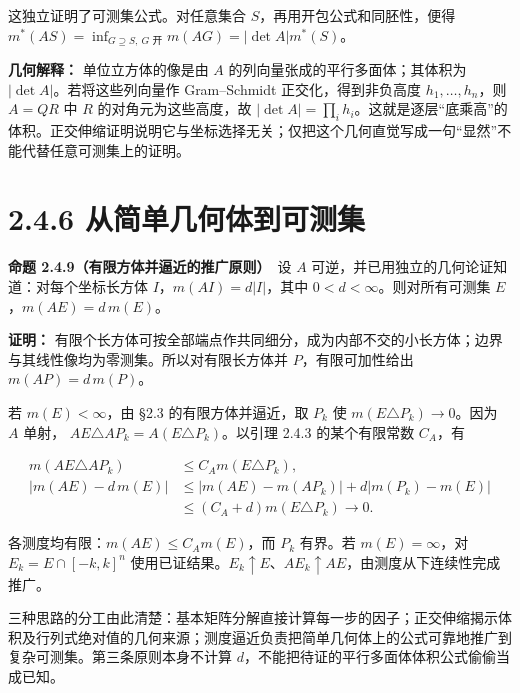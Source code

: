 \documentclass[11pt,a4paper]{article}
\begin{document}
这独立证明了可测集公式。对任意集合 \(S\)，再用开包公式和同胚性，便得
\(m^*(AS)=\inf_{G\supseteq S,\ G\text{ 开}}m(AG)=|\det A|m^*(S)\)。

\textbf{几何解释：} 单位立方体的像是由 \(A\)
的列向量张成的平行多面体；其体积为 \(|\det A|\)。若将这些列向量作
Gram--Schmidt 正交化，得到非负高度 \(h_1,\ldots,h_n\)，则 \(A=QR\) 中
\(R\) 的对角元为这些高度，故
\(|\det A|=\prod_i h_i\)。这就是逐层``底乘高''的体积。正交伸缩证明说明它与坐标选择无关；仅把这个几何直觉写成一句``显然''不能代替任意可测集上的证明。

\section[\S{}2.4.6
从简单几何体到可测集]{2.4.6
从简单几何体到可测集}\label{ux4eceux7b80ux5355ux51e0ux4f55ux4f53ux5230ux53efux6d4bux96c6}

\textbf{命题 2.4.9（有限方体并逼近的推广原则）}　设 \(A\)
可逆，并已用独立的几何论证知道：对每个坐标长方体
\(I\)，\(m(AI)=d|I|\)，其中 \(0<d<\infty\)。则对所有可测集
\(E\)，\(m(AE)=d\,m(E)\)。

\textbf{证明：}
有限个长方体可按全部端点作共同细分，成为内部不交的小长方体；边界与其线性像均为零测集。所以对有限长方体并
\(P\)，有限可加性给出 \(m(AP)=d\,m(P)\)。

若 \(m(E)<\infty\)，由 §2.3 的有限方体并逼近，取 \(P_k\) 使
\(m(E\triangle P_k)\to0\)。因为 \(A\) 单射，
\(AE\triangle AP_k=A(E\triangle P_k)\)。以引理 2.4.3 的某个有限常数
\(C_A\)，有

\begin{equation*}
\begin{aligned}
m(AE\triangle AP_k)&\le C_A m(E\triangle P_k),\\
|m(AE)-d\,m(E)|
&\le |m(AE)-m(AP_k)|+d|m(P_k)-m(E)|\\
&\le(C_A+d)m(E\triangle P_k)\longrightarrow0.
\end{aligned}
\tag{2.4.15}
\end{equation*}

各测度均有限：\(m(AE)\le C_A m(E)\)，而 \(P_k\) 有界。若
\(m(E)=\infty\)，对 \(E_k=E\cap[-k,k]^n\)
使用已证结果。\(E_k\uparrow E\)、\(AE_k\uparrow AE\)，由测度从下连续性完成推广。

三种思路的分工由此清楚：基本矩阵分解直接计算每一步的因子；正交伸缩揭示体积及行列式绝对值的几何来源；测度逼近负责把简单几何体上的公式可靠地推广到复杂可测集。第三条原则本身不计算
\(d\)，不能把待证的平行多面体体积公式偷偷当成已知。
\end{document}
